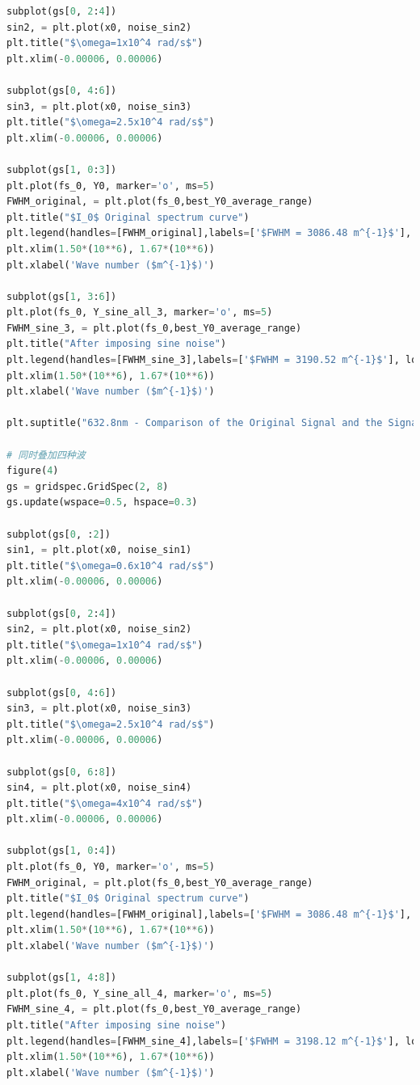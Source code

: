 \documentclass[conference]{IEEEtran}
\begin{document}
\begin{lstlisting}[language=python]
subplot(gs[0, 2:4])
sin2, = plt.plot(x0, noise_sin2)
plt.title("$\omega=1x10^4 rad/s$")
plt.xlim(-0.00006, 0.00006)

subplot(gs[0, 4:6])
sin3, = plt.plot(x0, noise_sin3)
plt.title("$\omega=2.5x10^4 rad/s$")
plt.xlim(-0.00006, 0.00006)

subplot(gs[1, 0:3])
plt.plot(fs_0, Y0, marker='o', ms=5)
FWHM_original, = plt.plot(fs_0,best_Y0_average_range)
plt.title("$I_0$ Original spectrum curve")
plt.legend(handles=[FWHM_original],labels=['$FWHM = 3086.48 m^{-1}$'], loc='upper right')
plt.xlim(1.50*(10**6), 1.67*(10**6))
plt.xlabel('Wave number ($m^{-1}$)')

subplot(gs[1, 3:6])
plt.plot(fs_0, Y_sine_all_3, marker='o', ms=5)
FWHM_sine_3, = plt.plot(fs_0,best_Y0_average_range)
plt.title("After imposing sine noise")
plt.legend(handles=[FWHM_sine_3],labels=['$FWHM = 3190.52 m^{-1}$'], loc='upper right')
plt.xlim(1.50*(10**6), 1.67*(10**6))
plt.xlabel('Wave number ($m^{-1}$)')

plt.suptitle("632.8nm - Comparison of the Original Signal and the Signal after Adding Sinusoidal Noise", fontsize = 20)

# 同时叠加四种波
figure(4)
gs = gridspec.GridSpec(2, 8)
gs.update(wspace=0.5, hspace=0.3)

subplot(gs[0, :2])
sin1, = plt.plot(x0, noise_sin1)
plt.title("$\omega=0.6x10^4 rad/s$")
plt.xlim(-0.00006, 0.00006)

subplot(gs[0, 2:4])
sin2, = plt.plot(x0, noise_sin2)
plt.title("$\omega=1x10^4 rad/s$")
plt.xlim(-0.00006, 0.00006)

subplot(gs[0, 4:6])
sin3, = plt.plot(x0, noise_sin3)
plt.title("$\omega=2.5x10^4 rad/s$")
plt.xlim(-0.00006, 0.00006)

subplot(gs[0, 6:8])
sin4, = plt.plot(x0, noise_sin4)
plt.title("$\omega=4x10^4 rad/s$")
plt.xlim(-0.00006, 0.00006)

subplot(gs[1, 0:4])
plt.plot(fs_0, Y0, marker='o', ms=5)
FWHM_original, = plt.plot(fs_0,best_Y0_average_range)
plt.title("$I_0$ Original spectrum curve")
plt.legend(handles=[FWHM_original],labels=['$FWHM = 3086.48 m^{-1}$'], loc='upper right')
plt.xlim(1.50*(10**6), 1.67*(10**6))
plt.xlabel('Wave number ($m^{-1}$)')

subplot(gs[1, 4:8])
plt.plot(fs_0, Y_sine_all_4, marker='o', ms=5)
FWHM_sine_4, = plt.plot(fs_0,best_Y0_average_range)
plt.title("After imposing sine noise")
plt.legend(handles=[FWHM_sine_4],labels=['$FWHM = 3198.12 m^{-1}$'], loc='upper right')
plt.xlim(1.50*(10**6), 1.67*(10**6))
plt.xlabel('Wave number ($m^{-1}$)')


\end{lstlisting}
\end{document}

